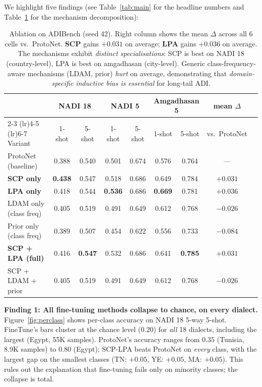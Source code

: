 \documentclass[11pt]{article}
\newcommand{\bench}{ADIBench}
\begin{document}
We highlight five findings (see Table~\ref{tab:main} for the
headline numbers and Table~\ref{tab:ablation} for the mechanism
decomposition):
\begin{table}[t]
\centering\small
\begin{tabular}{lcccccccc}
\toprule
& \multicolumn{2}{c}{NADI 18} & \multicolumn{2}{c}{NADI 5} & \multicolumn{2}{c}{Amgadhasan 5} & mean $\Delta$ \\
\cmidrule(lr){2-3} \cmidrule(lr){4-5} \cmidrule(lr){6-7}
Variant & 1-shot & 5-shot & 1-shot & 5-shot & 1-shot & 5-shot & vs.\ ProtoNet \\
\midrule
ProtoNet (baseline) & 0.388 & 0.540 & 0.501 & 0.674 & 0.576 & 0.764 & --- \\
\midrule
\textbf{SCP only} & \textbf{0.438} & 0.547 & 0.518 & 0.686 & 0.649 & 0.784 & $+0.031$ \\
\textbf{LPA only} & 0.418 & 0.544 & \textbf{0.536} & 0.686 & \textbf{0.669} & 0.781 & $+0.036$ \\
LDAM only (class freq) & 0.405 & 0.519 & 0.491 & 0.649 & 0.612 & 0.768 & $-0.026$ \\
Prior only (class freq) & 0.389 & 0.507 & 0.454 & 0.622 & 0.556 & 0.733 & $-0.084$ \\
\midrule
\textbf{SCP + LPA (full)} & 0.416 & \textbf{0.547} & 0.532 & 0.686 & 0.641 & \textbf{0.785} & $+0.031$ \\
SCP + LDAM + prior & 0.405 & 0.519 & 0.491 & 0.649 & 0.612 & 0.768 & $-0.026$ \\
\bottomrule
\end{tabular}
\caption{Ablation on \bench{} (seed 42). Right column shows
the mean $\Delta$ across all 6 cells vs.\ ProtoNet.
\textbf{SCP} gains $+0.031$ on average; \textbf{LPA} gains $+0.036$
on average. The mechanisms exhibit \emph{distinct specialisations}: SCP is best
on NADI 18 (country-level), LPA is best on amgadhasan
(city-level). Generic class-frequency-aware mechanisms (LDAM,
prior) \emph{hurt} on average, demonstrating that
\emph{domain-specific inductive bias is essential} for long-tail
ADI.}
\label{tab:ablation}
\end{table}

\textbf{Finding 1: All fine-tuning methods collapse to chance,
on every dialect.} Figure~\ref{fig:perclass} shows per-class
accuracy on NADI 18 5-way 5-shot. FineTune's bars cluster at
the chance level ($0.20$) for \emph{all} 18 dialects, including
the largest (Egypt, 55K samples). ProtoNet's accuracy ranges
from $0.35$ (Tunisia, 8.9K samples) to $0.80$ (Egypt); SCP-LPA
beats ProtoNet on \emph{every} class, with the largest gap on
the smallest classes (TN: $+0.05$, YE: $+0.05$, MA: $+0.05$).
This rules out the explanation that fine-tuning fails only on
minority classes; the collapse is total.
\end{document}
